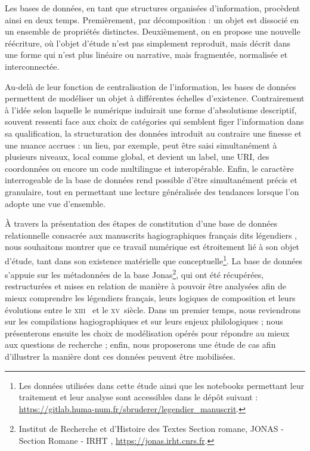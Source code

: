 \documentclass[final, fra]{anthology-ch}     %
\begin{document}
Les bases de données, en tant que structures organisées d'information, procèdent ainsi en deux temps. Premièrement, par décomposition : un objet est dissocié en un ensemble de propriétés distinctes. Deuxièmement, on en propose une nouvelle réécriture, où l'objet d'étude n'est pas simplement reproduit, mais décrit dans une forme qui n'est plus linéaire ou narrative, mais fragmentée, normalisée et interconnectée.

Au-delà de leur fonction de centralisation de l'information, les bases de données permettent de modéliser un objet à différentes échelles d'existence. Contrairement à l'idée selon laquelle le numérique induirait une forme d'absolutisme descriptif, souvent ressenti face aux choix de catégories qui semblent figer l'information dans sa qualification, la structuration des données introduit au contraire une finesse et une nuance accrues : un lieu, par exemple, peut être saisi simultanément à plusieurs niveaux, local comme global, et devient un label, une URI, des coordonnées ou encore un code multilingue et interopérable. Enfin, le caractère interrogeable de la base de données rend possible d'être simultanément précis et granulaire, tout en permettant une lecture généralisée des tendances lorsque l'on adopte une vue d'ensemble.

À travers la présentation des étapes de constitution d'une base de données relationnelle consacrée aux manuscrits hagiographiques français dits \og légendiers \fg{}, nous souhaitons montrer que ce travail  \og numérique \fg{} est étroitement lié à son objet d'étude, tant dans son existence matérielle que conceptuelle\footnote{Les données utilisées dans cette étude ainsi que les notebooks permettant leur traitement et leur analyse sont accessibles dans le dépôt suivant : \url{https://gitlab.huma-num.fr/sbruderer/legendier_manuscrit}.}. La base de données s'appuie sur les métadonnées de la base Jonas\footnote{Institut de Recherche et d'Histoire des Textes Section romane, \og JONAS - Section Romane - IRHT \fg{}, \url{https://jonas.irht.cnrs.fr}.}, qui ont été récupérées, restructurées et mises en relation de manière à pouvoir être analysées afin de mieux comprendre les légendiers français, leurs logiques de composition et leurs évolutions entre le \textsc{xiii}\ieme~ et le \textsc{xv}\ieme~siècle. Dans un premier temps, nous reviendrons sur les compilations hagiographiques et sur leurs enjeux philologiques ; nous présenterons ensuite les choix de modélisation opérés pour répondre au mieux aux questions de recherche ; enfin, nous proposerons une étude de cas afin d'illustrer la manière dont ces données peuvent être mobilisées.
\end{document}
